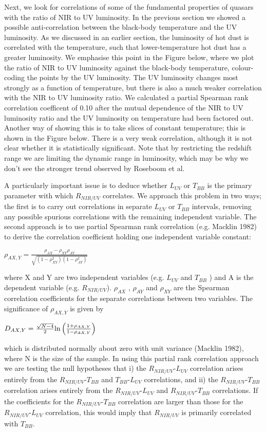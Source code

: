 Next, we look for correlations of some of the fundamental properties of quasars with the ratio of NIR to UV luminosity. 
In the previous section we showed a possible anti-correlation between the black-body temperature and the UV luminosity. 
As we discussed in an earlier section, the luminosity of hot dust is correlated with the temperature, such that lower-temperature hot dust has a greater luminosity. 
We emphasise this point in the Figure below, where we plot the ratio of NIR to UV luminosity against the black-body temperature, colour-coding the points by the UV luminosity. 
The UV luminosity changes most strongly as a function of temperature, but there is also a much weaker correlation with the NIR to UV luminosity ratio. 
We calculated a partial Spearman rank correlation coefficent of 0.10 after the mutual dependence of the NIR to UV luminosity ratio and the UV luminosity on temperature had been factored out. 
Another way of showing this is to take slices of constant temperature; this is shown in the Figure below. 
There is a very weak correlation, although it is not clear whether it is statistically significant. 
Note that by restricting the redshift range we are limiting the dynamic range in luminosity, which may be why we don't see the stronger trend observed by Roseboom et al. 

A particularly important issue is to deduce whether $L_{UV}$ or $T_{BB}$ is the primary parameter with which $R_{NIR/UV}$ correlates. 
We approach this problem in two ways; the first is to carry out correlations in separate $L_{UV}$ or $T_{BB}$ intervals, removing any possible spurious correlations with the remaining independent variable. 
The second approach is to use partial Spearman rank correlation (e.g. Macklin 1982) to derive the correlation coefficient holding one independent variable constant: 

$ \rho_{AX,Y} = \frac{ \rho_{AX} - \rho_{XY}\rho_{AY} } { \sqrt{ ( 1 - \rho^2_{XY} )(1 - \rho^2_{AY})} } $
 
where X and Y are two independent variables (e.g. $L_{UV}$ and $T_{BB}$ ) and A is the dependent variable (e.g. $R_{NIR/UV}$). 
$\rho_{AX}$ , $\rho_{AY}$ and $\rho_{XY}$ are the Spearman correlation coefficients for the separate correlations between two variables. 
The significance of $\rho_{AX,Y}$ is given by

$ D_{AX,Y} = \frac{\sqrt{N-4}}{2}{\rm ln} \left( \frac{ 1 + \rho_{AX,Y}}{ 1 - \rho_{AX,Y}} \right) $

which is distributed normally about zero with unit variance (Macklin 1982), where N is the size of the sample. 
In using this partial rank correlation approach we are testing the null hypotheses that i) the $R_{NIR/UV}$-$L_{UV}$ correlation arises entirely from the $R_{NIR/UV}$-$T_{BB}$ and $T_{BB}$-$L_{UV}$ correlations, and ii) the $R_{NIR/UV}$-$T_{BB}$ correlation arises entirely from the $R_{NIR/UV}$-$L_{UV}$ and $R_{NIR/UV}$-$T_{BB}$ correlations. 
If the coefficients for the $R_{NIR/UV}$-$T_{BB}$ correlation are larger than those for the $R_{NIR/UV}$-$L_{UV}$ correlation, this would imply that $R_{NIR/UV}$ is primarily correlated with $T_{BB}$.

